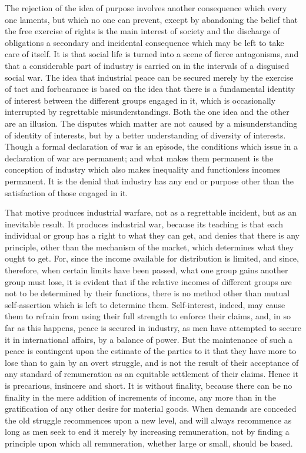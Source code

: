 \documentclass{book}
\begin{document}
The rejection of the idea of purpose involves another consequence which every one laments, but which no one can prevent, except by abandoning the belief that the free exercise of rights is the main interest of society and the discharge of obligations a secondary and incidental consequence which may be left to take care of itself. It is that social life is turned into a scene of fierce antagonisms, and that a considerable part of industry is carried on in the intervals of a disguised social war. The idea that industrial peace can be secured merely by the exercise of tact and forbearance is based on the idea that there is a fundamental identity of interest between the different groups engaged in it, which is occasionally interrupted by regrettable misunderstandings. Both the one idea and the other are an illusion. The disputes which matter are not caused by a misunderstanding of identity of interests, but by a better understanding of diversity of interests. Though a formal declaration of war is an episode, the conditions which issue in a declaration of war are permanent; and what makes them permanent is the conception of industry which also makes inequality and functionless incomes permanent. It is the denial that industry has any end or purpose other than the satisfaction of those engaged in it.

That motive produces industrial warfare, not as a regrettable incident, but as an inevitable result. It produces industrial war, because its teaching is that each individual or group has a right to what they can get, and denies that there is any principle, other than the mechanism of the market, which determines what they ought to get. For, since the income available for distribution is limited, and since, therefore, when certain limits have been passed, what one group gains another group must lose, it is evident that if the relative incomes of different groups are not to be determined by their functions, there is no method other than mutual self-assertion which is left to determine them. Self-interest, indeed, may cause them to refrain from using their full strength to enforce their claims, and, in so far as this happens, peace is secured in industry, as men have attempted to secure it in international affairs, by a balance of power. But the maintenance of such a peace is contingent upon the estimate of the parties to it that they have more to lose than to gain by an overt struggle, and is not the result of their acceptance of any standard of remuneration as an equitable settlement of their claims. Hence it is precarious, insincere and short. It is without finality, because there can be no finality in the mere addition of increments of income, any more than in the gratification of any other desire for material goods. When demands are conceded the old struggle recommences upon a new level, and will always recommence as long as men seek to end it merely by increasing remuneration, not by finding a principle upon which all remuneration, whether large or small, should be based.
\end{document}

